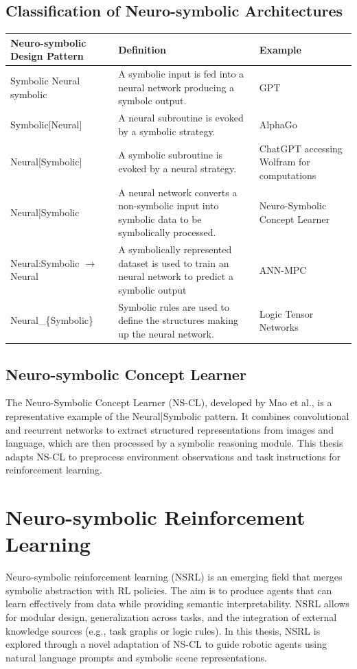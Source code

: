 \subsection{Classification of Neuro-symbolic Architectures} \label{ss:classification}
\begin{scriptsize}
	\begin{center}
		\begin{tabular}{ | m{5cm} | m{5cm}| m{5cm} | }
			\hline
			\textbf{Neuro-symbolic Design Pattern} & \textbf{Definition} & \textbf{Example}\\
			\hline
			Symbolic Neural symbolic & A symbolic input is fed into a neural network producing a symbolc output. & GPT \\
			\hline
			Symbolic[Neural] & A neural subroutine is evoked by a symbolic strategy. & AlphaGo \\
			\hline
			Neural[Symbolic] & A symbolic subroutine is evoked by a neural strategy. & ChatGPT accessing Wolfram for computations\\
			\hline
			Neural|Symbolic & A neural network converts a non-symbolic input into symbolic data to be symbolically processed. & Neuro-Symbolic Concept Learner \\
			\hline
			Neural:Symbolic $\rightarrow$ Neural & A symbolically represented dataset is used to train an neural network to predict a symbolic output & ANN-MPC \\
			\hline
			Neural\_\{Symbolic\} & Symbolic rules are used to define the structures making up the neural network. & Logic Tensor Networks \\
			\hline
		\end{tabular}
	\end{center}
\end{scriptsize}
\subsection{Neuro-symbolic Concept Learner} \label{ss:neurosymbolic_concept_learner}
The Neuro-Symbolic Concept Learner (NS-CL), developed by Mao et al., is a representative example of the Neural|Symbolic pattern. It combines convolutional and recurrent networks to extract structured representations from images and language, which are then processed by a symbolic reasoning module. This thesis adapts NS-CL to preprocess environment observations and task instructions for reinforcement learning.

\section{Neuro-symbolic Reinforcement Learning} \label{se:neurosymbolic_rl}
Neuro-symbolic reinforcement learning (NSRL) is an emerging field that merges symbolic abstraction with RL policies. The aim is to produce agents that can learn effectively from data while providing semantic interpretability. NSRL allows for modular design, generalization across tasks, and the integration of external knowledge sources (e.g., task graphs or logic rules). In this thesis, NSRL is explored through a novel adaptation of NS-CL to guide robotic agents using natural language prompts and symbolic scene representations.

